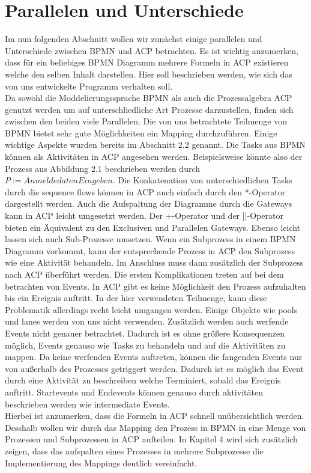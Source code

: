 \section{Parallelen und Unterschiede}\label{Parallelen und Unterschiede}
Im nun folgenden Abschnitt wollen wir zunächst einige parallelen und Unterschiede zwischen BPMN und ACP betrachten. Es ist wichtig anzumerken, dass für ein beliebiges BPMN Diagramm mehrere Formeln in ACP existieren welche den selben Inhalt darstellen. Hier soll beschrieben werden, wie sich das von uns entwickelte Programm verhalten soll.\\
Da sowohl die Moddelierungssprache BPMN als auch die Prozessalgebra ACP genutzt werden um auf unterschliedliche Art Prozesse darzustellen, finden sich zwischen den beiden viele Parallelen. Die von uns betrachtete Teilmenge von BPMN bietet sehr gute Möglichkeiten ein Mapping durchzuführen. Einige wichtige Aspekte wurden bereits im Abschnitt 2.2 genannt. Die Tasks aus BPMN können als Aktivitäten in ACP angesehen werden. Beispielsweise könnte also der Prozess aus Abbildung 2.1 beschrieben werden durch $P:=AnmeldedatenEingeben.$ Die Konkatenation von unterschiedlichen Tasks durch die sequence flows können in ACP auch einfach durch den *-Operator dargestellt werden. Auch die Aufspaltung der Diagramme durch die Gateways kann in ACP leicht umgesetzt werden. Der +-Operator und der ||-Operator bieten ein Äquivalent zu den Exclusiven und Parallelen Gateways. Ebenso leicht lassen sich auch Sub-Prozesse umsetzen. Wenn ein Subprozess in einem BPMN Diagramm vorkommt, kann der entsprechende Prozess in ACP den Subprozess wie eine Aktivität behandeln. Im Anschluss muss dann zusätzlich der Subprozess nach ACP überführt werden.
Die ersten Komplikationen treten auf bei dem betrachten von Events. In ACP gibt es keine Möglichkeit den Prozess aufzuhalten bis ein Ereignis auftritt. In der hier verwendeten Teilmenge, kann diese Problematik allerdings recht leicht umgangen werden. Einige Objekte wie pools und lanes werden von uns nicht verwenden. Zusätzlich werden auch werfende Events nicht genauer betrachtet. Dadurch ist es ohne größere Konsequenzen möglich, Events genauso wie Tasks zu behandeln und auf die Aktivitäten zu mappen. Da keine werfenden Events auftreten, können die fangenden Events nur von außerhalb des Prozesses getriggert werden. Dadurch ist es möglich das Event durch eine Aktivität zu beschreiben welche Terminiert, sobald das Ereignis auftritt. Startevents und Endevents können genauso durch aktivitäten beschrieben werden wie intermediate Events. \\
Hierbei ist anzumerken, dass die Formeln in ACP schnell unübersichtlich werden. Desshalb wollen wir durch das Mapping den Prozess in BPMN in eine Menge von Prozessen und Subprozessen in ACP aufteilen. In Kapitel 4 wird sich zusätzlich zeigen, dass das aufspalten eines Prozesses in mehrere Subprozesse die Implementierung des Mappings deutlich vereinfacht.\\
